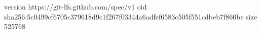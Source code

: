 version https://git-lfs.github.com/spec/v1
oid sha256:5c0499cf6705c379618d9c1f267f03344a6adfef6583c505f551cdbeb7f860be
size 525768
